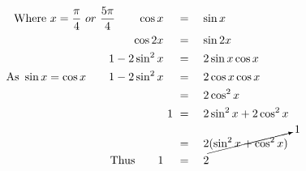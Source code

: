 \begin{align*}
\mathrm{Where}~x=\frac{\pi}{4}~or~\frac{5\pi}{4}\qquad\cos{x}\quad&\,=\quad\sin{x}\\
\cos{2x}\quad&\,=\quad\sin{2x}\\
1-2\sin^2{x}\quad&\,=\quad2\sin{x}\cos{x}\\
\mathrm{As}~\sin{x}=\cos{x}\qquad1-2\sin^2{x}\quad&\,=\quad2\cos{x}\cos{x}\\
\,&\,=\quad2\cos^2{x}\\
1\,&\,=\quad2\sin^2{x}+2\cos^2{x}\\
\,&\,=\quad2\cancelto{1}{(\sin^2{x+\cos^2{x}})}\\
\mathrm{Thus}\qquad1\quad&\,=\quad2
\end{align*}
